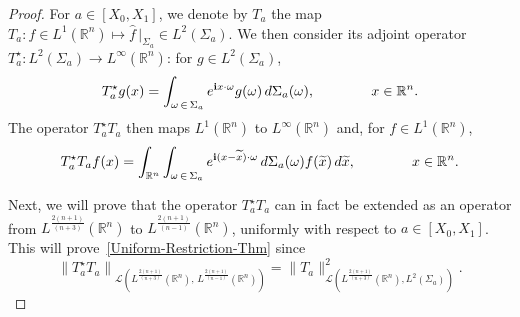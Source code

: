 \documentclass[10pt]{amsart}
\theoremstyle{definition}\newtheorem{defi}[theo]{Definition}\newtheorem{rema}[theo]{Remark}\newtheorem{exam}[theo]{Example}\newtheorem{exem}[theo]{Example}\newtheorem{nota}[theo]{Notation}
\newcommand{\scL}{\mathscr{L}}
\newcommand*\R{\mathbb{R}}
\renewcommand{\i}{\mathbf{i}}
\renewcommand{\tilde}{\widetilde}
\let\oldtilde\tilde
\renewcommand*{\tilde}[1]{\mathchoice{\widetilde{#1}}{\widetilde{#1}}{\oldtilde{#1}}{\oldtilde{#1}}}
\begin{document}
\begin{proof}
For $a \in [X_0, X_1]$, we denote by $T_{a}$ the map $T_{a} : f \in L^{1}(\R^n) \mapsto \widehat f \,|_{\Sigma_{a}} \in L^2(\Sigma_{a})$. We then consider its adjoint operator $T_{a}^\star : L^2(\Sigma_{a}) \to L^\infty(\R^n)$: for $g \in L^2(\Sigma_{a})$,
\begin{equation*}
T^\star_{a} g(x)
\\
=
\int_{{\omega}\, \in\,\Sigma_{a} } e^{\i x \cdot {\omega}} g({\omega}) \, d \Sigma_{a}({\omega}),
\qquad \qquad x\in \R^{n}.
\end{equation*}
The operator $T^\star_{a}T_{a}$ then maps $L^1(\R^n)$ to $L^\infty(\R^n)$ and, for $f \in L^1(\R^n)$,
\begin{equation}\label{Def-T-star-T}
T^\star_{a} T_{a} f(x) =
\int_{\R^{n}}
\int_{{\omega}\, \in\,\Sigma_{a} } e^{\i (x-\tilde{x}) \cdot {\omega}}
\, d \Sigma_{a}({\omega}) f(\tilde{x})
\, d \tilde{x},
\qquad \qquad x \in \R^n.
\end{equation}

Next, we will prove that the operator $ T^\star _{a}T_{a}$ can in fact be extended as an operator from $L^{\frac{2(n+1)}{(n+3)}}(\R^n)$ to $L^{\frac{2(n+1)}{(n-1)}}(\R^n)$, uniformly with respect to $a \in [X_0, X_1]$. This will prove~\eqref{Uniform-Restriction-Thm} since
\[
\left\| T^\star _{a}T_{a}\right\|_{\scL\left(L^{\frac{2(n+1)}{(n+3)}}(\R^n),\, L^{\frac{2(n+1)}{(n-1)}}(\R^n)\right)} =
\| T_a \|_{\scL\left(L^{\frac{2(n+1)}{(n+3)}}(\R^n), L^{2}(\Sigma_a)\right)}^2.
\]


\end{proof}
\end{document}
